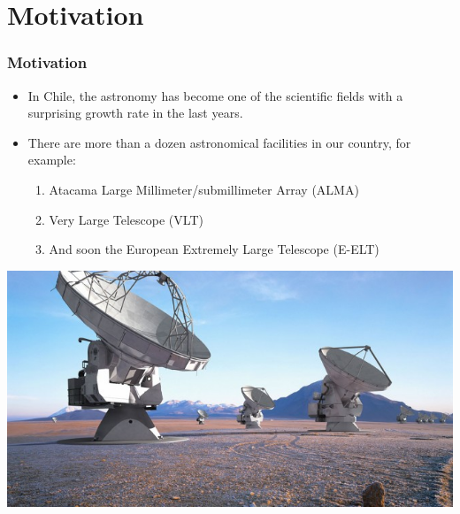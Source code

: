 \section{Motivation}

\begin{frame}
\frametitle{Motivation}

\begin{itemize}
	\item In Chile, the astronomy has become one of the scientific fields with a surprising growth rate in the last years.
	\item There are more than a dozen astronomical facilities in our country, for example:
		\begin{enumerate}
			\addtolength{\itemindent}{1cm}
			\item Atacama Large Millimeter/submillimeter Array (ALMA)
			\item Very Large Telescope (VLT)
			\item And soon the European Extremely Large Telescope (E-ELT)
		\end{enumerate}
\end{itemize}

\begin{center}
\includegraphics[height=0.3\textheight]{img/alma}
\end{center}


\end{frame}



